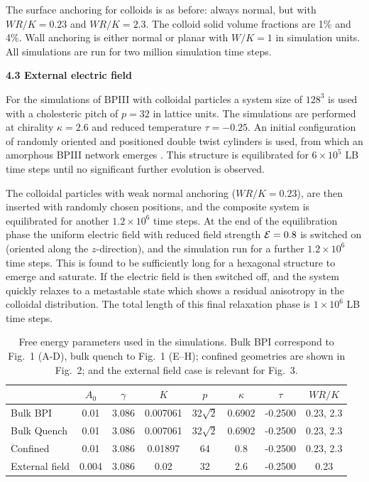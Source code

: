 \documentclass[12pt,twoside]{article}
\begin{document}
The surface anchoring for colloids is as before: always normal, but with
$WR/K = 0.23$ and $WR/K = 2.3$. The colloid solid volume fractions are
1\% and 4\%. Wall anchoring is either normal or planar with $W/K = 1$
in simulation units. All simulations are run for two million simulation
time steps.

{\bf 4.3 External electric field}

For the simulations of BPIII with colloidal particles a system size of
$128^3$ is used with a cholesteric pitch of $p=32$ in lattice units. 
The simulations are
performed at chirality $\kappa=2.6$ and reduced temperature $\tau=-0.25$.  
An initial configuration of
randomly oriented and positioned double twist cylinders is used,
from which an amorphous BPIII network emerges \cite{oliver-bp3}. This structure
is equilibrated for $6\times10^{5}$ LB time steps until no significant
further evolution is observed. 

The colloidal particles with weak
normal anchoring ($WR / K= 0.23$), are then inserted with randomly chosen positions,
and the composite system is equilibrated for another $1.2\times10^{6}$
time steps.
At the end of the equilibration phase the uniform electric field
with reduced field strength ${\cal E} = 0.8$ 
is switched on (oriented along the $z$-direction), and the simulation
run for a further $1.2\times10^{6}$ time steps.
This is found to be sufficiently long for a hexagonal structure to
emerge and saturate.
If the electric field is then switched off, and the system quickly relaxes
to a metastable state which shows a residual anisotropy in the
colloidal distribution. The total length of this final relaxation phase
is $1\times10^6$ LB time steps.

\begin{table}[h]
\begin{center}
\begin{tabular}{|l|c|c|c|c|c|c|c|}
\hline
         & $A_0$ & $\gamma$ & $K$ & $p$ & $\kappa$ & $\tau$ & $WR/K$\\
\hline 
Bulk BPI & 0.01 & 3.086 & 0.007061 & 32$\sqrt{2}$ & 0.6902 & -0.2500 &
0.23, 2.3\\
\hline
Bulk Quench & 0.01 & 3.086 & 0.007061 & 32$\sqrt{2}$ & 0.6902 & -0.2500 &
0.23, 2.3 \\
\hline
Confined & 0.01 & 3.086 & 0.01897 & 64 & 0.8 & -0.2500 & 0.23, 2.3\\
\hline
External field & 0.004& 3.086 & 0.02 & 32 & 2.6 & -0.2500 & 0.23\\ 
\hline
\end{tabular}
\end{center}
\caption{Free energy parameters used in the simulations. Bulk BPI
correspond to Fig.~1 (A-D), bulk quench to Fig.~1 (E--H); confined
geometries are shown in Fig.~2; and the external field case is
relevant for Fig.~3.}
\label{table:params}
\end{table}
\end{document}

